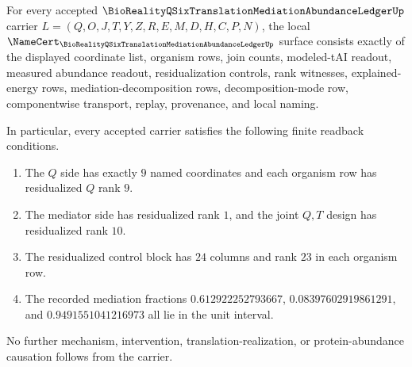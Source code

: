 \begin{theorem}
\label{thm:bioreality-q-six-translation-mediation-abundance-namecert-obligations}
For every accepted $\BioRealityQSixTranslationMediationAbundanceLedgerUp$ carrier $L=(Q,O,J,T,Y,Z,R,E,M,D,H,C,P,N)$, the local $\NameCert_{\BioRealityQSixTranslationMediationAbundanceLedgerUp}$ surface consists exactly of the displayed coordinate list, organism rows, join counts, modeled-tAI readout, measured abundance readout, residualization controls, rank witnesses, explained-energy rows, mediation-decomposition rows, decomposition-mode row, componentwise transport, replay, provenance, and local naming.

In particular, every accepted carrier satisfies the following finite readback conditions.
\begin{enumerate}
\item The $Q$ side has exactly $9$ named coordinates and each organism row has residualized $Q$ rank $9$.
\item The mediator side has residualized rank $1$, and the joint $Q,T$ design has residualized rank $10$.
\item The residualized control block has $24$ columns and rank $23$ in each organism row.
\item The recorded mediation fractions $0.612922252793667$, $0.08397602919861291$, and $0.9491551041216973$ all lie in the unit interval.
\end{enumerate}
No further mechanism, intervention, translation-realization, or protein-abundance causation follows from the carrier.
\end{theorem}

